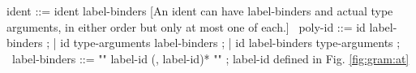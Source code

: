 \begin{syntax}
  ident ::= ident label-binders [An ident can have label-binders and actual type arguments, in either order but only at most one of each.]
  \
  poly-id ::= id label-binders ;
  | id type-arguments label-binders ;
  | id label-binders type-arguments ;
  \
  label-binders ::= "{" label-id (, label-id)* "}" ; label-id defined in Fig. \ref{fig:gram:at}
\end{syntax}
